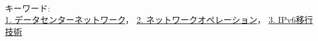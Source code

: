 



~ \\

キーワード:\\
\underline{1. データセンターネットワーク}，
\underline{2. ネットワークオペレーション}，
\underline{3. IPv6移行技術}
\begin{flushright}
\dept \\
\author
\end{flushright}
